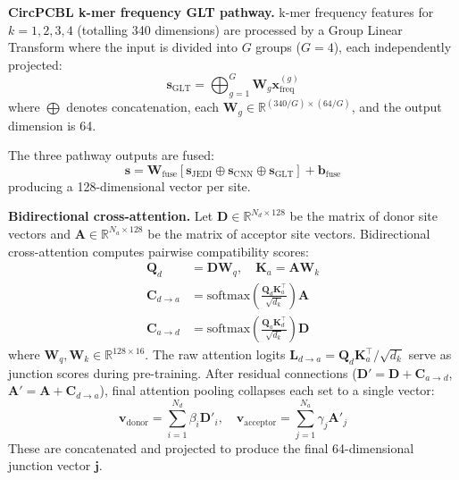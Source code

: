 \documentclass[12pt]{article}
\begin{document}
\textbf{CircPCBL k-mer frequency GLT pathway.} k-mer frequency features for $k = 1, 2, 3, 4$ (totalling 340 dimensions) are processed by a Group Linear Transform where the input is divided into $G$ groups ($G=4$), each independently projected:
\begin{equation}
\mathbf{s}_\text{GLT} = \bigoplus_{g=1}^{G} \mathbf{W}_g \mathbf{x}^{(g)}_\text{freq}
\end{equation}
where $\bigoplus$ denotes concatenation, each $\mathbf{W}_g \in \mathbb{R}^{(340/G) \times (64/G)}$, and the output dimension is 64.

The three pathway outputs are fused:
\begin{equation}
\mathbf{s} = \mathbf{W}_\text{fuse}\left[\mathbf{s}_\text{JEDI} \oplus \mathbf{s}_\text{CNN} \oplus \mathbf{s}_\text{GLT}\right] + \mathbf{b}_\text{fuse}
\end{equation}
producing a 128-dimensional vector per site.

\textbf{Bidirectional cross-attention.} Let $\mathbf{D} \in \mathbb{R}^{N_d \times 128}$ be the matrix of donor site vectors and $\mathbf{A} \in \mathbb{R}^{N_a \times 128}$ be the matrix of acceptor site vectors. Bidirectional cross-attention computes pairwise compatibility scores:
\begin{align}
\mathbf{Q}_d &= \mathbf{D} \mathbf{W}_q, \quad \mathbf{K}_a = \mathbf{A} \mathbf{W}_k \\
\mathbf{C}_{d \rightarrow a} &= \text{softmax}\left(\frac{\mathbf{Q}_d \mathbf{K}_a^\top}{\sqrt{d_k}}\right) \mathbf{A} \\
\mathbf{C}_{a \rightarrow d} &= \text{softmax}\left(\frac{\mathbf{Q}_a \mathbf{K}_d^\top}{\sqrt{d_k}}\right) \mathbf{D}
\end{align}
where $\mathbf{W}_q, \mathbf{W}_k \in \mathbb{R}^{128 \times 16}$. The raw attention logits $\mathbf{L}_{d \rightarrow a} = \mathbf{Q}_d \mathbf{K}_a^\top / \sqrt{d_k}$ serve as junction scores during pre-training. After residual connections ($\mathbf{D}' = \mathbf{D} + \mathbf{C}_{a \rightarrow d}$, $\mathbf{A}' = \mathbf{A} + \mathbf{C}_{d \rightarrow a}$), final attention pooling collapses each set to a single vector:
\begin{equation}
\mathbf{v}_\text{donor} = \sum_{i=1}^{N_d} \beta_i \mathbf{D}'_i, \quad
\mathbf{v}_\text{acceptor} = \sum_{j=1}^{N_a} \gamma_j \mathbf{A}'_j
\end{equation}
These are concatenated and projected to produce the final 64-dimensional junction vector $\mathbf{j}$.
\end{document}
